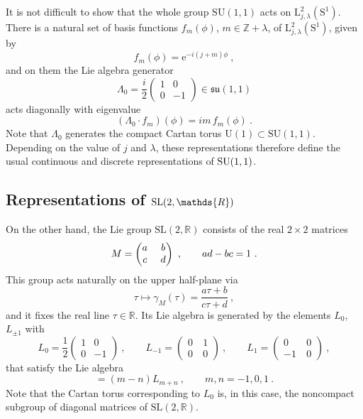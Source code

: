 \documentclass[12pt,a4paper]{article}
\newcommand{\be}{\begin{equation}}
\newcommand{\ee}{\end{equation}}
\begin{document}
It is not difficult to show that the whole group $\mathrm{SU}(1,1)$ acts on 
$\mathrm{L}_{j,\lambda}^2(\mathrm{S}^1)$. There is a natural set of basis functions $f_m(\phi)$, $m\in \mathds{Z}+\lambda$, of $\mathrm{L}_{j,\lambda}^2(\mathrm{S}^1)$, given by 
\be
f_m(\phi) = \mathrm{e}^{-i(j +m)\phi} \ , 
\ee
and on them the Lie algebra generator 
\be
\Lambda_{0}=\frac{i}{2}\begin{pmatrix} 1 & 0 \\ 0 & -1 \end{pmatrix} \in \mathfrak{su}(1,1)
\ee
acts diagonally with eigenvalue 
\be
(\Lambda_0 \cdot f_m)(\phi) =  i m \, f_m(\phi) \ . 
\ee
Note that  $\Lambda_0$ generates the compact Cartan torus $\mathrm{U}(1) \subset \mathrm{SU}(1,1)$.
Depending on the value of $j$ and $\lambda$, these representations therefore define the usual continuous and discrete representations of ${\rm SU}(1,1)$. 

\subsection{Representations of ${\rm SL}(2,\mathds{R})$}

On the other hand, the Lie group $\mathrm{SL}(2,\mathds{R})$  consists of the real $2\times 2$ matrices 
\be\label{sl2}
M = \begin{pmatrix} a \ & b \cr c\  & d \end{pmatrix}  \ , \qquad 
ad - bc = 1 \ . 
\ee
This group acts naturally on the upper half-plane via 
\be\label{gammaM}
\tau \mapsto \gamma_M(\tau) = \frac{a\tau + b}{ c\tau +d} \ , 
\ee
and it fixes the real line $\tau\in\mathds{R}$. Its Lie algebra is generated by the elements $L_0$, $L_{\pm 1}$ with 
\be
L_{0}=\frac{1}{2}\begin{pmatrix} 1  & 0 \\ 0 & -1 \end{pmatrix}\ , \qquad 
L_{-1}=\begin{pmatrix} 0\ & 1 \\ 0 \ & 0 \end{pmatrix}\ , \qquad 
L_{1}=\begin{pmatrix} 0 \ & 0 \\ -1\ & 0 \end{pmatrix}\ , 
\ee
that satisfy the Lie algebra 
\be 
[L_m,L_n]=(m-n)L_{m+n}\ , \qquad m,n=-1,0,1\ . \label{eq:sl2R commutation relations}
\ee
Note that the Cartan torus corresponding to $L_0$ is, in this case, the noncompact subgroup of diagonal matrices of $\mathrm{SL}(2,\mathds{R})$. 
\end{document}
